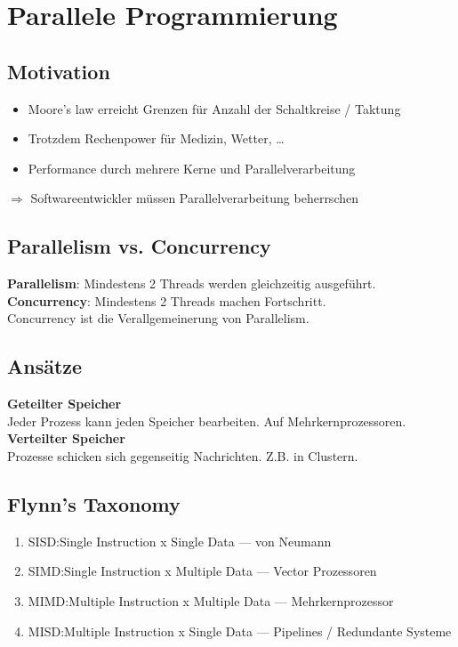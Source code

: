 

\section{Parallele Programmierung}%
\label{pp:sec:parallele-programmierung}

\subsection{Motivation}%
\label{pp:sub:motivation}
\begin{itemize}
  \item Moore's law erreicht Grenzen für Anzahl der Schaltkreise / Taktung
  \item Trotzdem Rechenpower für Medizin, Wetter, \ldots
  \item Performance durch mehrere Kerne und Parallelverarbeitung
\end{itemize}
\(\Rightarrow\) Softwareentwickler müssen Parallelverarbeitung beherrschen

\subsection{Parallelism vs. Concurrency}%
\label{pp:sub:parallelism-vs-concurrency}
\textbf{Parallelism}: Mindestens 2 Threads werden gleichzeitig ausgeführt.\\
\textbf{Concurrency}: Mindestens 2 Threads machen Fortschritt.\\
Concurrency ist die Verallgemeinerung von Parallelism.

\subsection{Ansätze}%
\label{pp:sub:ansaetze}
\textbf{Geteilter Speicher}\\
Jeder Prozess kann jeden Speicher bearbeiten. Auf Mehrkernprozessoren.\\
\textbf{Verteilter Speicher}\\
Prozesse schicken sich gegenseitig Nachrichten. Z.B. in Clustern.

\subsection{Flynn's Taxonomy}%
\label{pp:sub:flynns-taxonomy}
\begin{enumerate}
  \item SISD:\@ Single Instruction x Single Data --- von Neumann
  \item SIMD:\@ Single Instruction x Multiple Data --- Vector Prozessoren
  \item MIMD:\@ Multiple Instruction x Multiple Data --- Mehrkernprozessor
  \item MISD:\@ Multiple Instruction x Single Data --- Pipelines / Redundante Systeme
\end{enumerate}

